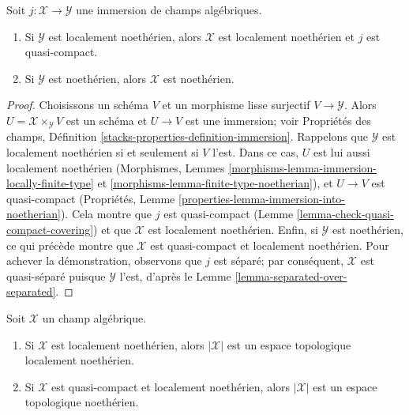 \begin{lemma}
\label{lemma-locally-closed-in-noetherian}
Soit $j : \mathcal{X} \to \mathcal{Y}$ une immersion de champs algébriques.
\begin{enumerate}
\item Si $\mathcal{Y}$ est localement noethérien, alors
$\mathcal{X}$ est localement noethérien et $j$ est quasi-compact.
\item Si $\mathcal{Y}$ est noethérien, alors $\mathcal{X}$ est noethérien.
\end{enumerate}
\end{lemma}

\begin{proof}
Choisissons un schéma $V$ et un morphisme lisse surjectif
$V \to \mathcal{Y}$. Alors $U = \mathcal{X} \times_\mathcal{Y} V$ est un
schéma et $U \to V$ est une immersion; voir Propriétés des champs,
Définition \ref{stacks-properties-definition-immersion}. Rappelons que
$\mathcal{Y}$ est localement noethérien si et seulement si $V$ l'est. Dans ce
cas, $U$ est lui aussi localement noethérien (Morphismes, Lemmes
\ref{morphisms-lemma-immersion-locally-finite-type} et
\ref{morphisms-lemma-finite-type-noetherian}), et $U \to V$ est quasi-compact
(Propriétés, Lemme \ref{properties-lemma-immersion-into-noetherian}). Cela
montre que $j$ est quasi-compact
(Lemme \ref{lemma-check-quasi-compact-covering}) et que $\mathcal{X}$ est
localement noethérien. Enfin, si $\mathcal{Y}$ est noethérien, ce qui précède
montre que $\mathcal{X}$ est quasi-compact et localement noethérien. Pour
achever la démonstration, observons que $j$ est séparé; par conséquent,
$\mathcal{X}$ est quasi-séparé puisque $\mathcal{Y}$ l'est, d'après le
Lemme \ref{lemma-separated-over-separated}.
\end{proof}

\begin{lemma}
\label{lemma-Noetherian-topology}
Soit $\mathcal{X}$ un champ algébrique.
\begin{enumerate}
\item Si $\mathcal{X}$ est localement noethérien, alors $|\mathcal{X}|$ est
un espace topologique localement noethérien.
\item Si $\mathcal{X}$ est quasi-compact et localement noethérien, alors
$|\mathcal{X}|$ est un espace topologique noethérien.
\end{enumerate}
\end{lemma}

